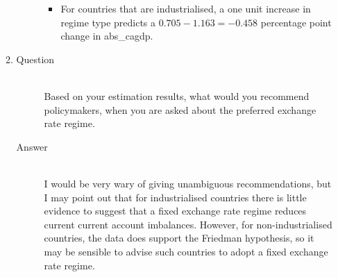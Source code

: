 \documentclass{article}
\begin{document}
\begin{enumerate}
\begin{enumerate}[label=(\alph*)]
\begin{description}
\begin{itemize}
      \item For countries that are industrialised, a one unit increase in regime type predicts a \(0.705 - 1.163 = -0.458\) percentage point change in abs\_cagdp.
      
      \end{itemize}
    \end{description}
    \item 
    \begin{description}
      \item[Question] \hfill \\
      Based on your estimation results, what would you recommend policymakers, when you are asked about the preferred exchange rate regime.
      \item[Answer] \hfill \\
      I would be very wary of giving unambiguous recommendations, but I may point out that for industrialised countries there is little evidence to suggest that a fixed exchange rate regime reduces current current account imbalances. However, for non-industrialised countries, the data does support the Friedman hypothesis, so it may be sensible to advise such countries to adopt a fixed exchange rate regime. 
    \end{description}
  \end{enumerate}
\end{enumerate}
\end{document}
